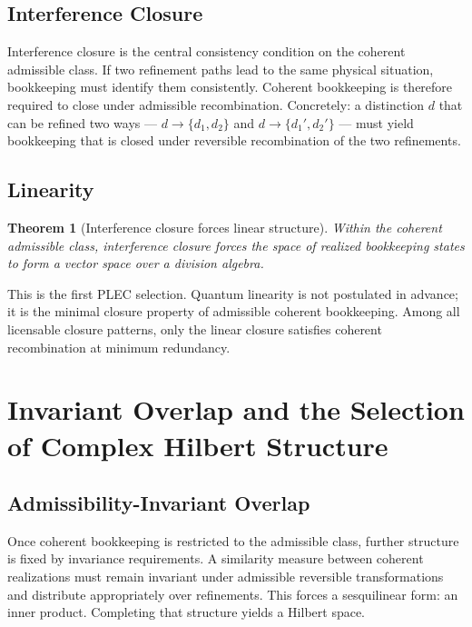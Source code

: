 \documentclass[11pt]{article}
\newtheorem{theorem}{Theorem}[section]
\begin{document}
\subsection{Interference Closure}
Interference closure is the central consistency condition on the coherent
admissible class. If two refinement paths lead to the same physical situation,
bookkeeping must identify them consistently. Coherent bookkeeping is therefore
required to close under admissible recombination. Concretely: a distinction $d$
that can be refined two ways --- $d \to \{d_1, d_2\}$ and $d \to \{d_1', d_2'\}$
--- must yield bookkeeping that is closed under reversible recombination of the
two refinements.

\subsection{Linearity}
\begin{theorem}[Interference closure forces linear structure]
Within the coherent admissible class, interference closure forces the space of
realized bookkeeping states to form a vector space over a division algebra.
\end{theorem}
This is the first PLEC selection. Quantum linearity is not postulated in advance;
it is the minimal closure property of admissible coherent bookkeeping. Among all
licensable closure patterns, only the linear closure satisfies coherent
recombination at minimum redundancy.

\section{Invariant Overlap and the Selection of Complex Hilbert Structure}\label{sec:hilbert}

\subsection{Admissibility-Invariant Overlap}
Once coherent bookkeeping is restricted to the admissible class, further structure
is fixed by invariance requirements. A similarity measure between coherent
realizations must remain invariant under admissible reversible transformations and
distribute appropriately over refinements. This forces a sesquilinear form: an
inner product. Completing that structure yields a Hilbert space.
\end{document}
